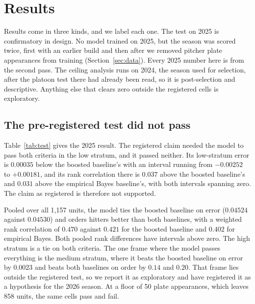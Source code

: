 \documentclass[11pt,letterpaper]{article}
\begin{document}
\section{Results}
\label{sec:results}

Results come in three kinds, and we label each one. The test on 2025 is confirmatory in design. No model trained on 2025, but the season was scored twice, first with an earlier build and then after we removed pitcher plate appearances from training (Section~\ref{sec:data}). Every 2025 number here is from the second pass. The ceiling analysis runs on 2024, the season used for selection, after the platoon test there had already been read, so it is post-selection and descriptive. Anything else that clears zero outside the registered cells is exploratory.

\subsection{The pre-registered test did not pass}
\label{sec:test}

Table~\ref{tab:test} gives the 2025 result. The registered claim needed the model to pass both criteria in the low stratum, and it passed neither. Its low-stratum error is $0.00035$ below the boosted baseline's with an interval running from $-0.00252$ to $+0.00181$, and its rank correlation there is $0.037$ above the boosted baseline's and $0.031$ above the empirical Bayes baseline's, with both intervals spanning zero. The claim as registered is therefore not supported.

Pooled over all 1,157 units, the model ties the boosted baseline on error ($0.04524$ against $0.04530$) and orders hitters better than both baselines, with a weighted rank correlation of $0.470$ against $0.421$ for the boosted baseline and $0.402$ for empirical Bayes. Both pooled rank differences have intervals above zero. The high stratum is a tie on both criteria. The one frame where the model passes everything is the medium stratum, where it beats the boosted baseline on error by $0.0023$ and beats both baselines on order by $0.14$ and $0.20$. That frame lies outside the registered test, so we report it as exploratory and have registered it as a hypothesis for the 2026 season. At a floor of 50 plate appearances, which leaves 858 units, the same cells pass and fail.
\end{document}
